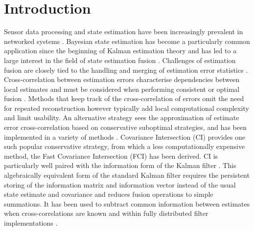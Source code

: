 \documentclass[letterpaper, 10 pt, conference]{ieeeconf}  %
\begin{document}
\section{Introduction}
Sensor data processing and state estimation have been increasingly prevalent in networked systems \cite{hallDistributedDataFusion2012,chongFortyYearsDistributed2017}. Bayesian state estimation has become a particularly common application since the beginning of Kalman estimation theory \cite{kalmanNewApproachLinear1960} and has led to a large interest in the field of state estimation fusion \cite{willnerKalmanFilterAlgorithms1977,chongHIERARCHICALESTIMATION,chongDistributedTrackingDistributed1986,hashemipourDecentralizedStructuresParallel1988,grimeDataFusionDecentralized1994}. Challenges of estimation fusion are closely tied to the handling and merging of estimation error statistics \cite{fouratiMultisensorDataFusion2017}. Cross-correlation between estimation errors characterise dependencies between local estimates and must be considered when performing consistent or optimal fusion \cite{bar-shalomTracktotrackCorrelationProblem1981,sunMultisensorOptimalInformation2004}. Methods that keep track of the cross-correlation of errors omit the need for repeated reconstruction \cite{steinbringOptimalSamplebasedFusion2016} however typically add local computational complexity and limit usability. An alternative strategy sees the approximation of estimate error cross-correlation based on conservative suboptimal strategies, and has been implemented in a variety of methods \cite{carlsonFederatedFilterFaulttolerant1988,julierNondivergentEstimationAlgorithm,sijsStateFusionUnknown2010,noackInverseCovarianceIntersection2017,niehsenInformationFusionBased2002,frankenImprovedFastCovariance2005}. Covariance Intersection (CI) \cite{julierNondivergentEstimationAlgorithm} provides one such popular conservative strategy, from which a less computationally expensive method, the Fast Covariance Intersection (FCI) \cite{niehsenInformationFusionBased2002} has been derived. CI is particularly well paired with the information form of the Kalman filter \cite{mutambaraDecentralizedEstimationControl2019}. This algebraically equivalent form of the standard Kalman filter requires the persistent storing of the information matrix and information vector instead of the usual state estimate and covariance and reduces fusion operations to simple summations. It has been used to subtract common information between estimates when cross-correlations are known \cite{grimeDataFusionDecentralized1994} and within fully distributed filter implementations \cite{pfaffInformationFormDistributed2017}.
\end{document}
